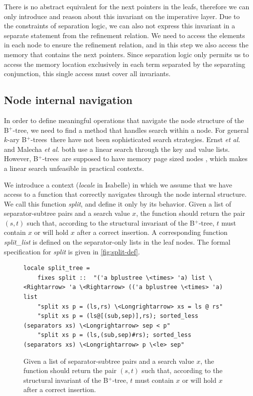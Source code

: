 \documentclass[a4paper,UKenglish,cleveref, autoref, thm-restate]{lipics-v2021}
\newcommand{\btree}{B$^+$-tree}
\newcommand{\btrees}{B$^+$-trees}
\begin{document}
There is no abstract equivalent for the next pointers in the leafs,
therefore we can only introduce and reason about this invariant on the imperative layer.
Due to the constraints of separation logic, we can also not express this invariant
in a separate statement from the refinement relation.
We need to access the elements in each node to ensure the refinement relation,
and in this step we also access the memory that contains the next pointers.
Since separation logic only permits us to access the memory location
exclusively in each term separated by the separating conjunction, this single access 
must cover all invariants.


\subsection{Node internal navigation}
\label{sec:split}

In order to define meaningful operations that navigate
the node structure of the \btree,
we need to find a method that handles search within a node.
For general $k$-ary \btrees\ there have not been sophisticated search strategies.
Ernst \emph{et al.} \cite{DBLP:journals/sosym/ErnstSR15} and Malecha \emph{et al.} \cite{DBLP:conf/popl/MalechaMSW10}
both use a linear search through the key and value lists.
However, \btrees\ are supposed to have memory page sized nodes \cite{DBLP:journals/csur/Comer79}, 
which makes a linear search unfeasible in practical contexts.

We introduce a context (\emph{locale} in Isabelle) in which we assume that we
have access to a function that correctly navigates through the node internal structure.
We call this function \emph{split}, and define it only by its behavior.
Given a list of separator-subtree pairs and a search value $x$, the function should return the pair $(s,t)$ such that,
according to the structural invariant of the \btree, $t$ must contain $x$ or will hold $x$ after a correct insertion.
A corresponding function \emph{split\_list} is defined on the separator-only lists in the leaf nodes.
The formal specification for \emph{split} is given in \autoref{fig:split-def}.

\begin{figure}
   \centering 
\begin{lstlisting}[mathescape=true, language=Isabelle,label=lst:split-def]
locale split_tree =
    fixes split ::  "('a bplustree \<times> 'a) list \<Rightarrow> 'a \<Rightarrow> (('a bplustree \<times> 'a) list 
    "split xs p = (ls,rs) \<Longrightarrow> xs = ls @ rs" 
    "split xs p = (ls@[(sub,sep)],rs); sorted_less (separators xs) \<Longrightarrow> sep < p" 
    "split xs p = (ls,(sub,sep)#rs); sorted_less (separators xs) \<Longrightarrow> p \<le> sep" 

\end{lstlisting}
    \caption[Definition of \emph{split}]{
        Given a list of separator-subtree pairs and a search value $x$, the function should return the pair $(s,t)$ such that,
        according to the structural invariant of the \btree, $t$ must contain $x$ or will hold $x$ after a correct insertion.
    }
    \label{fig:split-def}
\end{figure}
\end{document}
